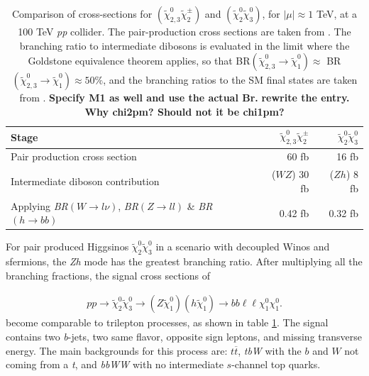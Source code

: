 \documentclass[a4paper,11pt]{article}
\newcommand{\Shufang}[1]{{\bf\color{Maroon}  #1}}
\newcommand{\N}{\widetilde{\chi}^0}
\newcommand{\image}[2]{\parbox{#1\textwidth}{\texttt{[image: images/\#2.pdf]}}}
\begin{document}
\begin{table}
  \centering
  \begin{tabular}{l|rr}
    \toprule
    Stage & $\N_{2,3}\widetilde{\chi}^\pm_{2}$ & $\N_2\N_3$\\
    \midrule
    Pair production cross section & 60 fb & 16 fb\\
    Intermediate diboson contribution & ($WZ$) 30 fb  & ($Zh$) 8 fb \\
    Applying \emph{BR}$(W\rightarrow l\nu)$, \emph{BR}$(Z\rightarrow ll)$ \& \emph{BR}$(h\rightarrow bb)$ & 0.42 fb & 0.32 fb\\
    \bottomrule
  \end{tabular}
  \caption{Comparison of cross-sections for
    $(\widetilde{\chi}_{2,3}^0\widetilde{\chi}^\pm_{2})$ and
    $(\N_{2}\N_{3})$, for $|\mu|\approx 1$ TeV, at a 100
    TeV \emph{pp} collider. The pair-production cross sections are taken from
    \citep{Gori:2014oua}. The branching ratio to intermediate dibosons is
    evaluated in the limit where the Goldstone equivalence theorem applies, so
    that BR$(\widetilde{\chi}_{2,3}^0\rightarrow\widetilde{\chi}_{1}^0)\approx$
    BR$(\widetilde{\chi}_{2,3}^0\rightarrow\widetilde{\chi}_1^0)\approx 50\% $,
    and the branching ratios to the SM final states are taken from
    \citep{Olive:2016xmw}.  \Shufang{Specify M1 as well and use the actual Br.} \Shufang{rewrite the entry.  Why chi2pm? Should not it be chi1pm?}}
  \label{tab:xsections}
\end{table}


For pair produced Higgsinos $\tilde\chi_2^0\tilde\chi_3^0$ in a scenario with
decoupled Winos and  sfermions, the \emph{Zh} mode has the greatest
branching ratio.  After multiplying all the branching fractions, the signal cross
sections of 

\begin{align}
pp\rightarrow \widetilde{\chi}_{2}^{0}\widetilde{\chi}_{3}^{0}\rightarrow
(Z\widetilde{\chi}_1^{0})(h\widetilde{\chi}_1^{0})\rightarrow
bb\ell\ell \chi_1^0\chi_1^0.
\end{align}
become comparable  to trilepton processes, as shown in    table \ref{tab:xsections}.    The signal contains two
\emph{b}-jets, two same flavor, opposite sign leptons, and missing transverse
energy. The main backgrounds for this process are: $t\overline{t}$, \emph{tbW} with
the $b$ and $W$ not coming from a \emph{t}, and \emph{bbWW} with no intermediate
$s$-channel top quarks.  

\end{document}
